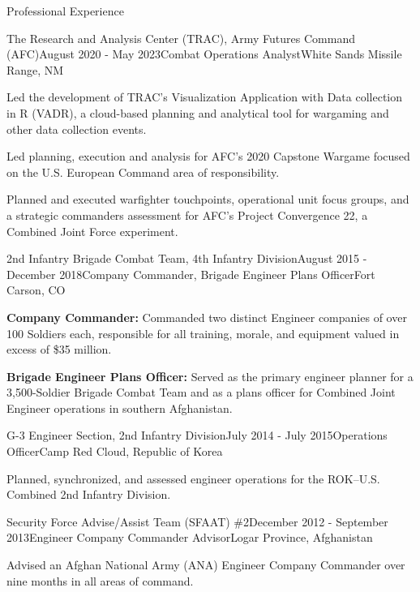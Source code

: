 \documentclass[
	11pt,
]{resume}
\begin{document}
\begin{rSection}{Professional Experience}

	\begin{rSubsection}{The Research and Analysis Center (TRAC), Army Futures Command (AFC)}{August 2020 - May 2023}{Combat Operations Analyst}{White Sands Missile Range, NM}
		\item Led the development of TRAC’s Visualization Application with Data collection in R (VADR), a cloud-based planning and analytical tool for wargaming and other data collection events.
		\item Led planning, execution and analysis for AFC’s 2020 Capstone Wargame focused on the U.S. European Command area of responsibility.
		\item Planned and executed warfighter touchpoints, operational unit focus groups, and a strategic commanders assessment for AFC’s Project Convergence 22, a Combined Joint Force experiment.
	\end{rSubsection}

	\begin{rSubsection}{2nd Infantry Brigade Combat Team, 4th Infantry Division}{August 2015 - December 2018}{Company Commander, Brigade Engineer Plans Officer}{Fort Carson, CO}
		\item \textbf{Company Commander:} Commanded two distinct Engineer companies of over 100 Soldiers each, responsible for all training, morale, and equipment valued in excess of \$35 million.
		\item \textbf{Brigade Engineer Plans Officer:} Served as the primary engineer planner for a 3,500-Soldier Brigade Combat Team and as a plans officer for Combined Joint Engineer operations in southern Afghanistan.
	\end{rSubsection}

	\begin{rSubsection}{G-3 Engineer Section, 2nd Infantry Division}{July 2014 - July 2015}{Operations Officer}{Camp Red Cloud, Republic of Korea}
		\item Planned, synchronized, and assessed engineer operations for the ROK–U.S. Combined 2nd Infantry Division.
	\end{rSubsection}

	\begin{rSubsection}{Security Force Advise/Assist Team (SFAAT) \#2}{December 2012 - September 2013}{Engineer Company Commander Advisor}{Logar Province, Afghanistan}
		\item Advised an Afghan National Army (ANA) Engineer Company Commander over nine months in all areas of command.
	\end{rSubsection}


\end{rSection}
\end{document}
